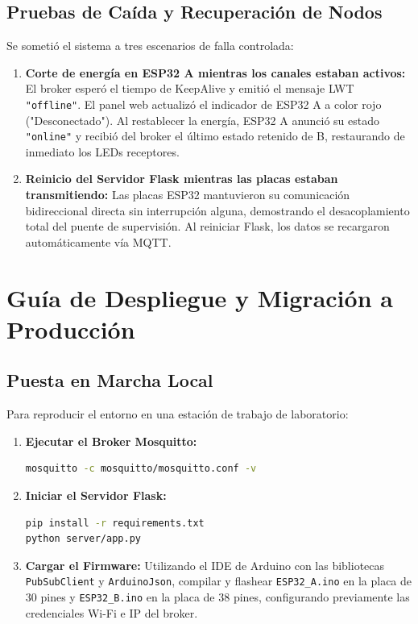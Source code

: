 \documentclass[11pt,a4paper]{article}
\begin{document}
\subsection{Pruebas de Caída y Recuperación de Nodos}
Se sometió el sistema a tres escenarios de falla controlada:
\begin{enumerate}
    \item \textbf{Corte de energía en ESP32 A mientras los canales estaban activos:} El broker esperó el tiempo de KeepAlive y emitió el mensaje LWT \texttt{"offline"}. El panel web actualizó el indicador de ESP32 A a color rojo ("Desconectado"). Al restablecer la energía, ESP32 A anunció su estado \texttt{"online"} y recibió del broker el último estado retenido de B, restaurando de inmediato los LEDs receptores.
    \item \textbf{Reinicio del Servidor Flask mientras las placas estaban transmitiendo:} Las placas ESP32 mantuvieron su comunicación bidireccional directa sin interrupción alguna, demostrando el desacoplamiento total del puente de supervisión. Al reiniciar Flask, los datos se recargaron automáticamente vía MQTT.
\end{enumerate}

\section{Guía de Despliegue y Migración a Producción}

\subsection{Puesta en Marcha Local}
Para reproducir el entorno en una estación de trabajo de laboratorio:
\begin{enumerate}
    \item \textbf{Ejecutar el Broker Mosquitto:}
    \begin{lstlisting}[language=bash]
mosquitto -c mosquitto/mosquitto.conf -v
    \end{lstlisting}
    \item \textbf{Iniciar el Servidor Flask:}
    \begin{lstlisting}[language=bash]
pip install -r requirements.txt
python server/app.py
    \end{lstlisting}
    \item \textbf{Cargar el Firmware:} Utilizando el IDE de Arduino con las bibliotecas \texttt{PubSubClient} y \texttt{ArduinoJson}, compilar y flashear \texttt{ESP32\_A.ino} en la placa de 30 pines y \texttt{ESP32\_B.ino} en la placa de 38 pines, configurando previamente las credenciales Wi-Fi e IP del broker.
\end{enumerate}
\end{document}
